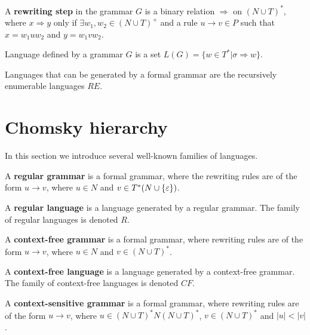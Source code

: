 \begin{definition}
A {\bf rewriting step} in the grammar $G$ is a binary relation $\Rightarrow$ on $(N\cup T)^*$, where $x\Rightarrow y$ only if $\exists w_1, w_2\in (N\cup T)^+$ and a rule $u\rightarrow v \in P$ such that $x=w_1uw_2$ and $y=w_1vw_2$.
\end{definition}

\begin{definition}
Language defined by a grammar $G$ is a set $L(G)=\{w\in T^*|\sigma\Rightarrow w\}$.
\end{definition}

Languages that can be generated by a formal grammar are the recursively enumerable languages $RE$.



\section{Chomsky hierarchy} %
\label{sec:chomsky_hierarchy}

In this section we introduce several well-known families of languages.

\begin{definition}
A {\bf regular grammar} is a formal grammar, where the rewriting rules are of the form $u\rightarrow v$, where $u\in N$ and $v\in T^*(N\cup \{\varepsilon\})$.
\end{definition}

\begin{definition}
A {\bf regular language} is a language generated by a regular grammar. The family of regular languages is denoted $R$.
\end{definition}

\begin{definition}
A {\bf context-free grammar} is a formal grammar, where rewriting rules are of the form $u\rightarrow v$, where $u\in N$ and $v\in (N\cup T)^*$.
\end{definition}

\begin{definition}
A {\bf context-free language} is a language generated by a context-free grammar. The family of context-free languages is denoted $CF$.
\end{definition}

\begin{definition}
A {\bf context-sensitive grammar} is a formal grammar, where rewriting rules are of the form $u\rightarrow v$, where $u\in (N\cup T)^*N(N\cup T)^*$, $v\in (N\cup T)^*$ and $|u| < |v|$.
\end{definition}


